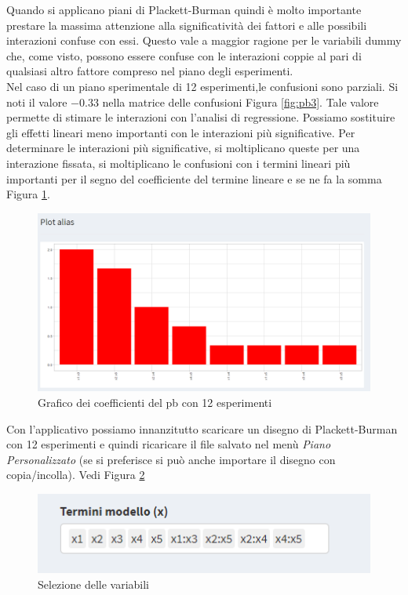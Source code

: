 \documentclass[
  11pt,
]{book}
\begin{document}
Quando si applicano piani di Plackett-Burman quindi è molto importante prestare la massima attenzione alla significatività dei fattori e alle possibili interazioni confuse con essi. Questo vale a maggior ragione per le variabili dummy che, come visto, possono essere confuse con le interazioni coppie al pari di qualsiasi altro fattore compreso nel piano degli esperimenti.\\
Nel caso di un piano sperimentale di 12 esperimenti,le confusioni sono parziali. Si noti il valore \(-0.33\) nella matrice delle confusioni Figura \ref{fig:pb3}. Tale valore permette di stimare le interazioni con l'analisi di regressione. Possiamo sostituire gli effetti lineari meno importanti con le interazioni più significative.
\newpage
Per determinare le interazioni più significative, si moltiplicano queste per una interazione fissata, si moltiplicano le confusioni con i termini lineari più importanti per il segno del coefficiente del termine lineare e se ne fa la somma Figura \ref{fig:pb9}.

\begin{figure}[ht]

{\centering \includegraphics[width=1\linewidth]{Immagini/PB/09_alias12} 

}

\caption{Grafico dei coefficienti del pb con 12 esperimenti}\label{fig:pb9}
\end{figure}

Con l'applicativo possiamo innanzitutto scaricare un disegno di Plackett-Burman con 12 esperimenti e quindi ricaricare il file salvato nel menù \emph{Piano Personalizzato} (se si preferisce si può anche importare il disegno con copia/incolla). Vedi Figura \ref{fig:pb10}

\begin{figure}[ht]

{\centering \includegraphics[width=1\linewidth]{Immagini/PB/10_pp1} 

}

\caption{Selezione delle variabili}\label{fig:pb10}
\end{figure}
\end{document}

